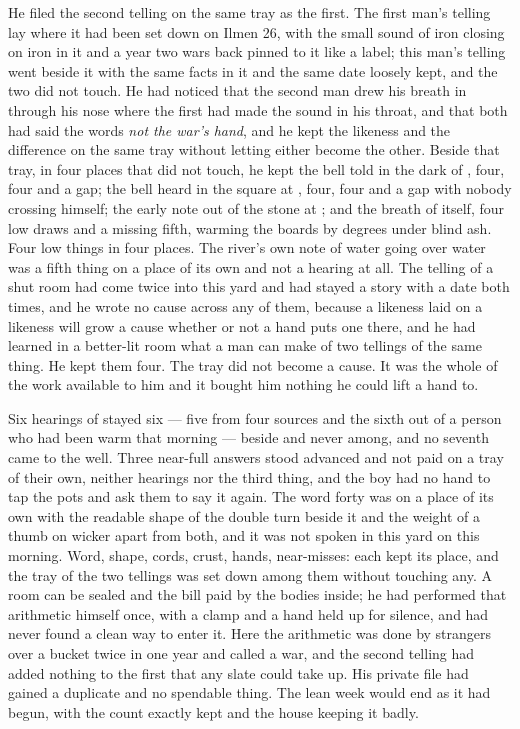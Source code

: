 He filed the second telling on the same tray as the first. The first man's telling lay where it had been set down on Ilmen 26, with the small sound of iron closing on iron in it and a year two wars back pinned to it like a label; this man's telling went beside it with the same facts in it and the same date loosely kept, and the two did not touch. He had noticed that the second man drew his breath in through his nose where the first had made the sound in his throat, and that both had said the words \emph{not the war's hand}, and he kept the likeness and the difference on the same tray without letting either become the other. Beside that tray, in four places that did not touch, he kept the bell told in the dark of , four, four and a gap; the bell heard in the square at , four, four and a gap with nobody crossing himself; the early note out of the stone at ; and the breath of  itself, four low draws and a missing fifth, warming the boards by degrees under blind ash. Four low things in four places. The river's own note of water going over water was a fifth thing on a place of its own and not a hearing at all. The telling of a shut room had come twice into this yard and had stayed a story with a date both times, and he wrote no cause across any of them, because a likeness laid on a likeness will grow a cause whether or not a hand puts one there, and he had learned in a better-lit room what a man can make of two tellings of the same thing. He kept them four. The tray did not become a cause. It was the whole of the work available to him and it bought him nothing he could lift a hand to.

\scenebreak

Six hearings of  stayed six --- five from four sources and the sixth out of a person who had been warm that morning --- beside and never among, and no seventh came to the well. Three near-full answers stood advanced and not paid on a tray of their own, neither hearings nor the third thing, and the boy had no hand to tap the pots and ask them to say it again. The word forty was on a place of its own with the readable shape of the double turn beside it and the weight of a thumb on wicker apart from both, and it was not spoken in this yard on this morning. Word, shape, cords, crust, hands, near-misses: each kept its place, and the tray of the two tellings was set down among them without touching any. A room can be sealed and the bill paid by the bodies inside; he had performed that arithmetic himself once, with a clamp and a hand held up for silence, and had never found a clean way to enter it. Here the arithmetic was done by strangers over a bucket twice in one year and called a war, and the second telling had added nothing to the first that any slate could take up. His private file had gained a duplicate and no spendable thing. The lean week would end as it had begun, with the count exactly kept and the house keeping it badly.

